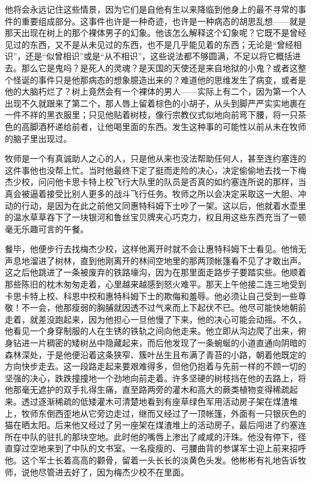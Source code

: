     他将会永远记住这些情景，因为它们是自他有生以来降临到他身上的最不寻常的事件的重要组成部分。这事件也许是一种奇迹，也许是一种病态的胡思乱想——就是那天出现在树上的那个裸体男子的幻象。他该怎么解释这个幻象呢？它既不是曾经见过的东西，又不是从未见过的东西，也不是几乎能见着的东西；无论是“曾经相识”，还是“似曾相识”或是“从不相识”，这些说法都不够圆满，不足以将它概括进去。那么它是鬼吗？是死人的灵魂？是天国的天使还是来自地狱的小鬼？或者这整个怪诞的事件只是他那病态的想象臆造出来的？难道他的思维发生了病变，或者是他的大脑朽烂了？树上竟然会有一个裸体的男人——实际上有二个，因为第一个人出现不久就跟来了第二个，那人唇上留着棕色的小胡子，从头到脚严严实实地裹在一件不祥的黑衣服里；只见他贴着树枝，像行宗教仪式似地向前弯下腰，将一只茶色的高脚酒杯递给前者，让他喝里面的东西。发生这种事的可能性以前从未在牧师的脑子里出现过。

    牧师是一个有真诚助人之心的人，只是他从来也没法帮助任何人，甚至连约塞连的这件事他也没帮上忙。当时他最终下定了挺而走险的决心，决定偷偷地去找一下梅杰少校，问问他卡思卡特上校飞行大队里的队员是否真的如约塞连所说的那样，当真会被逼着接受比别人更多的战斗飞行任务。牧师之所以会决定采取这一大胆、冲动的行动，是因为在此之前他又同惠特科姆下士吵了一架。这以后，他就着水壶里的温水草草吞下了一块银河和鲁丝宝贝牌夹心巧克力，权且用这些东西充当了一顿毫无乐趣可言的午餐。
 


    餐毕，他便步行去找梅杰少校，这样他离开时就不会让惠特科姆下士看见。他悄无声息地溜进了树林，直到他刚离开的林间空地里的那两顶帐篷看不见了才敢出声。这之后他跳进了一条被废弃的铁路壕沟，因为在那里面走路步子要踏实些。他顺着那些陈旧的枕木匆匆走着，心里越来越感到怒火难平。那天上午他接二连三地受到卡思卡特上校、科恩中校和惠特科姆下士的欺侮和羞辱。他必须让自己受到一些尊敬！不一会，他那瘦弱的胸脯就因透不过气来而上下起伏不已。他尽可能快地朝前走着，就差没跑起来，因为他担心一旦他慢了下来，他的决心可能会动摇。不久，他看见一个身穿制服的人在生锈的铁轨之间向他走来。他立即从沟边爬了出来，俯身钻进一片稠密的矮树丛中隐藏起来，而后他发现了一条蜿蜒的小道直通向阴暗的森林深处，于是他便沿着这条狭窄、簇叶丛生且布满了青苔的小路，朝着他既定的方向快步走去。这一段路走起来要艰难得多，但他仍抱着与先前一样的不顾一切的坚强的决心，跌跌撞撞地一个劲地向前走着。许多坚硬的树枝挡在他的去路上，将他那毫无遮护的双手扎得生痛，直至路两旁的灌木和高大的蕨类植物变得稀疏起来。透过逐渐稀疏的低矮灌木可清楚地看到有座草绿色军用活动房子架在煤渣堆上，牧师东倒西歪地从它旁边走过，继而又经过了一顶帐篷，外面有一只银灰色的猫在晒太阳。后来他又经过了另一座架在煤渣堆上的活动房子，最后闯进了约塞连所在中队的驻扎的那块空地。此时他的嘴唇上渗出了咸咸的汗珠。他没有停下，径直穿过空地来到了中队的文书室。一名瘦瘦的、弓腰曲背的参谋军士迎上前来招呼他。这个军士长着高高的颧骨，留着一头长长的淡黄色头发。他彬彬有礼地告诉牧师，说他尽管进去好了，因为梅杰少校不在里面。


